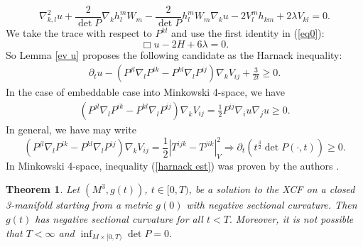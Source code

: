 \documentclass{amsart}
\newtheorem{theorem}{Theorem}
\theoremstyle{definition}
\theoremstyle{remark}
\numberwithin{equation}{section}
\begin{document}
\begin{equation*}
\nabla^2_{k,l}u+\frac{2}{\det P}\nabla_kh_l^mW_m-\frac{2}{\det P}h_l^mW_m\nabla_ku-2V_l^mh_{km}+2\lambda V_{kl}=0.
\end{equation*}
We take the trace with respect to $P^{kl}$ and use the first identity in (\ref{eq0}):
\begin{equation}\label{eq:5}
\Box u-2H+6\lambda=0.
\end{equation}
So Lemma \ref{ev u} proposes the following candidate as the  Harnack inequality:
 \begin{align}\label{harnack est}
\partial_tu-\left(P^{jl}\nabla_lP^{ik}-P^{kl}\nabla_l P^{ij}\right)\nabla_kV_{ij}+\frac{3}{2t}\geq 0.
\end{align}
In the case of embeddable case into Minkowski 4-space, we have
 \begin{align}\label{question}
 \left(P^{jl}\nabla_lP^{ik}-P^{kl}\nabla_l P^{ij}\right)\nabla_kV_{ij}=\frac{1}{2}P^{ij}\nabla_i u\nabla_j u\geq 0.
 \end{align}
 In general, we have may write
 \[\left(P^{jl}\nabla_lP^{ik}-P^{kl}\nabla_l P^{ij}\right)\nabla_kV_{ij}=\frac{1}{2}\left|T^{ijk}-T^{jik}\right|^2_{V}\Rightarrow \partial_t\left(t^{\frac{3}{2}}\det P(\cdot,t)\right)\geq 0. \]
In Minkowski 4-space, inequality (\ref{harnack est}) was proven  by the authors \cite{BIS4}.
\begin{theorem}
Let $(M^3,g(t))$, $t\in [0,T)$, be a solution to the XCF on a closed 3-manifold starting from a metric $g(0)$ with negative sectional curvature. Then $g(t)$ has negative sectional curvature for all $t<T.$
Moreover, it is not possible that $T<\infty$ and $\inf_{M\times [0,T)}\det P=0.$
\end{theorem}
\end{document}
